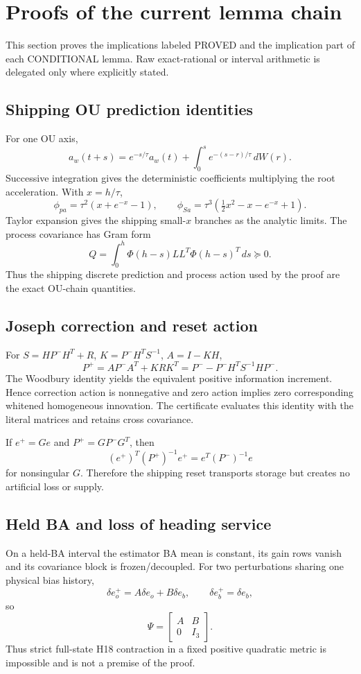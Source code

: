 \section{Proofs of the current lemma chain}
This section proves the implications labeled PROVED and the implication part of each CONDITIONAL lemma.  Raw exact-rational or interval arithmetic is delegated only where explicitly stated.

\subsection{Shipping OU prediction identities}
For one OU axis,
\[
a_w(t+s)=e^{-s/\tau}a_w(t)+\int_0^s e^{-(s-r)/\tau}\,dW(r).
\]
Successive integration gives the deterministic coefficients multiplying the root acceleration. With \(x=h/\tau\),
\[
\phi_{pa}=\tau^2(x+e^{-x}-1),\qquad
\phi_{Sa}=\tau^3(\tfrac12x^2-x-e^{-x}+1).
\]
Taylor expansion gives the shipping small-\(x\) branches as the analytic limits. The process covariance has Gram form
\[
Q=\int_0^h\Phi(h-s)LL^T\Phi(h-s)^T\,ds\succeq0.
\]
Thus the shipping discrete prediction and process action used by the proof are the exact OU-chain quantities.

\subsection{Joseph correction and reset action}
For \(S=HP^-H^T+R\), \(K=P^-H^TS^{-1}\), \(A=I-KH\),
\[
P^+=AP^-A^T+KRK^T
=P^- -P^-H^TS^{-1}HP^-.
\]
The Woodbury identity yields the equivalent positive information increment. Hence correction action is nonnegative and zero action implies zero corresponding whitened homogeneous innovation. The certificate evaluates this identity with the literal matrices and retains cross covariance.

If \(e^+=Ge\) and \(P^+=GP^-G^T\), then
\[
(e^+)^T(P^+)^{-1}e^+=e^T(P^-)^{-1}e
\]
for nonsingular \(G\). Therefore the shipping reset transports storage but creates no artificial loss or supply.

\subsection{Held BA and loss of heading service}
On a held-BA interval the estimator BA mean is constant, its gain rows vanish and its covariance block is frozen/decoupled. For two perturbations sharing one physical bias history,
\[
\delta e_o^+=A\delta e_o+B\delta e_b,\qquad
\delta e_b^+=\delta e_b,
\]
so
\[
\Psi=\begin{bmatrix}A&B\\0&I_3\end{bmatrix}.
\]
Thus strict full-state H18 contraction in a fixed positive quadratic metric is impossible and is not a premise of the proof.

